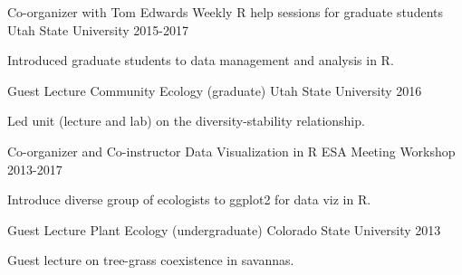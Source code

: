 

\begin{cventries}

  \cventry
    {Co-organizer with Tom Edwards} %
    {Weekly R help sessions for graduate students} %
    {Utah State University} %
    {2015-2017} %
    {
      \begin{cvitems} %
        \item {Introduced graduate students to data management and analysis in R.}
      \end{cvitems}
    }

  \cventry
    {Guest Lecture} %
    {Community Ecology (graduate)} %
    {Utah State University} %
    {2016} %
    {
      \begin{cvitems} %
        \item {Led unit (lecture and lab) on the diversity-stability relationship.}
      \end{cvitems}
    }

  \cventry
    {Co-organizer and Co-instructor} %
    {Data Visualization in R} %
    {ESA Meeting Workshop} %
    {2013-2017} %
    {
      \begin{cvitems} %
        \item {Introduce diverse group of ecologists to ggplot2 for data viz in R.}
      \end{cvitems}
    }

  \cventry
    {Guest Lecture} %
    {Plant Ecology (undergraduate)} %
    {Colorado State University} %
    {2013} %
    {
      \begin{cvitems} %
        \item {Guest lecture on tree-grass coexistence in savannas.}
      \end{cvitems}
    }


\end{cventries}
